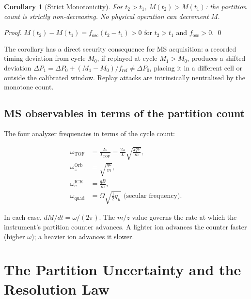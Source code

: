 \documentclass[twocolumn,10pt,a4paper]{article}
\theoremstyle{thmstyle}
\newtheorem{corollary}[theorem]{Corollary}
\theoremstyle{definition}
\theoremstyle{remark}
\newcommand{\DP}{\Delta P}
\newcommand{\Mcyc}{M}
\newcommand{\fref}{f_{\mathrm{ref}}}
\begin{document}
\begin{corollary}[Strict Monotonicity]
\label{cor:mono}
For $t_2 > t_1$, $\Mcyc(t_2) > \Mcyc(t_1)$: the partition count is
strictly non-decreasing. No physical operation can decrement $M$.
\end{corollary}

\begin{proof}
$\Mcyc(t_2) - \Mcyc(t_1) = f_{\mathrm{osc}}(t_2 - t_1) > 0$ for
$t_2 > t_1$ and $f_{\mathrm{osc}} > 0$. \qed
\end{proof}

The corollary has a direct security consequence for MS acquisition:
a recorded timing deviation from cycle $M_0$, if replayed at cycle
$M_1 > M_0$, produces a shifted deviation
$\DP_1 = \DP_0 + (M_1-M_0)/\fref \neq \DP_0$, placing it in a different
cell or outside the calibrated window. Replay attacks are intrinsically
neutralised by the monotone count.

\subsection{MS observables in terms of the partition count}

The four analyzer frequencies in terms of the cycle count:

\begin{align}
\omega_{\mathrm{TOF}} &= \frac{2\pi}{T_{\mathrm{TOF}}} = \frac{2\pi}{L}\sqrt{\frac{2qV}{m}},
\label{eq:tof-omega}\\
\omega_z^{\mathrm{Orb}} &= \sqrt{\frac{q\kappa}{m}},
\label{eq:orb-omega}\\
\omega_c^{\mathrm{ICR}} &= \frac{qB}{m},
\label{eq:icr-omega}\\
\omega_{\mathrm{quad}} &= \Omega\sqrt{\tfrac{1}{2}q_u} \text{ (secular frequency)}.
\label{eq:quad-omega}
\end{align}

In each case, $dM/dt = \omega/(2\pi)$. The $m/z$ value governs the rate
at which the instrument's partition counter advances. A lighter ion
advances the counter faster (higher $\omega$); a heavier ion advances it
slower.

\section{The Partition Uncertainty and the Resolution Law}
\label{sec:uncertainty}
\end{document}
